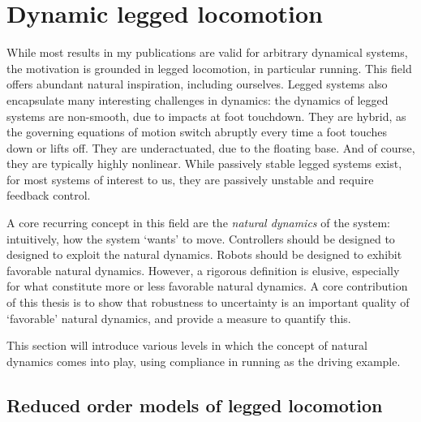 \section{Dynamic legged locomotion}
While most results in my publications are valid for arbitrary dynamical systems, the motivation is grounded in legged locomotion, in particular running. This field offers abundant natural inspiration, including ourselves. Legged systems also encapsulate many interesting challenges in dynamics: the dynamics of legged systems are non-smooth, due to impacts at foot touchdown. They are hybrid, as the governing equations of motion switch abruptly every time a foot touches down or lifts off. They are underactuated, due to the floating base. And of course, they are typically highly nonlinear. While passively stable legged systems exist, for most systems of interest to us, they are passively unstable and require feedback control. \par
A core recurring concept in this field are the \emph{natural dynamics} of the system: intuitively, how the system `wants' to move. Controllers should be designed to designed to exploit the natural dynamics. Robots should be designed to exhibit favorable natural dynamics. However, a rigorous definition is elusive, especially for what constitute more or less favorable natural dynamics. A core contribution of this thesis is to show that robustness to uncertainty is an important quality of `favorable' natural dynamics, and provide a measure to quantify this. \par
This section will introduce various levels in which the concept of natural dynamics comes into play, using compliance in running as the driving example.

\subsection{Reduced order models of legged locomotion}\label{subs:models}

